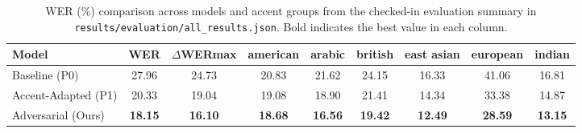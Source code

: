 \begin{table}[t]
\centering
\caption{WER (\%) comparison across models and accent groups from the checked-in evaluation summary in \texttt{results/evaluation/all\_results.json}. Bold indicates the best value in each column.}
\label{tab:main_results}
\begin{tabular}{l cc cccccc}
\toprule
\textbf{Model} & \textbf{WER} & \textbf{$\Delta$WERmax} & \textbf{american} & \textbf{arabic} & \textbf{british} & \textbf{east asian} & \textbf{european} & \textbf{indian} \\
\midrule
Baseline (P0) & 27.96 & 24.73 & 20.83 & 21.62 & 24.15 & 16.33 & 41.06 & 16.81 \\
Accent-Adapted (P1) & 20.33 & 19.04 & 19.08 & 18.90 & 21.41 & 14.34 & 33.38 & 14.87 \\
Adversarial (Ours) & \textbf{18.15} & \textbf{16.10} & \textbf{18.68} & \textbf{16.56} & \textbf{19.42} & \textbf{12.49} & \textbf{28.59} & \textbf{13.15} \\
\bottomrule
\end{tabular}
\end{table}
